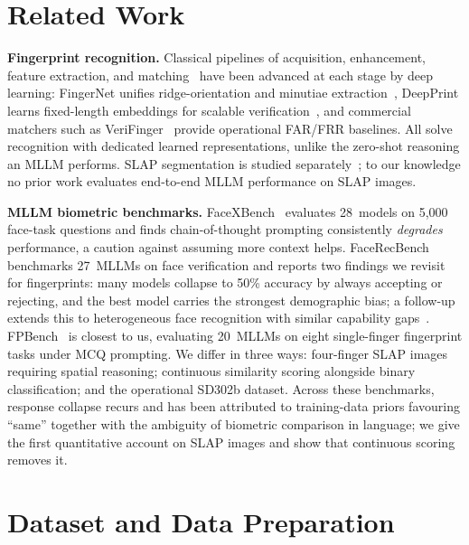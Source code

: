 \documentclass[runningheads]{llncs}
\begin{document}
\section{Related Work}
\label{sec:related}

\textbf{Fingerprint recognition.}
Classical pipelines of acquisition, enhancement, feature extraction, and
matching~\cite{maltoni_handbook} have been advanced at each stage by deep
learning: FingerNet unifies ridge-orientation and minutiae
extraction~\cite{fingerNet}, DeepPrint learns fixed-length embeddings for
scalable verification~\cite{deepprint}, and commercial matchers such as
VeriFinger~\cite{verifinger} provide operational FAR/FRR baselines. All solve
recognition with dedicated learned representations, unlike the zero-shot
reasoning an MLLM performs. SLAP segmentation is studied
separately~\cite{murshed2024SlapSeg}; to our knowledge no prior work
evaluates end-to-end MLLM performance on SLAP images.

\textbf{MLLM biometric benchmarks.}
FaceXBench~\cite{facexbench2024} evaluates 28~models on 5{,}000 face-task
questions and finds chain-of-thought prompting consistently \emph{degrades}
performance, a caution against assuming more context helps.
FaceRecBench~\cite{facerecbench2025} benchmarks 27~MLLMs on face verification
and reports two findings we revisit for fingerprints: many models collapse to
50\% accuracy by always accepting or rejecting, and the best model carries the
strongest demographic bias; a follow-up extends this to heterogeneous face
recognition with similar capability gaps~\cite{shahreza2026hfr}.
FPBench~\cite{fpbench2025} is closest to us, evaluating 20~MLLMs on eight
single-finger fingerprint tasks under MCQ prompting. We differ in three ways:
four-finger SLAP images requiring spatial reasoning; continuous similarity
scoring alongside binary classification; and the operational SD302b dataset.
Across these benchmarks, response collapse recurs and has been attributed to
training-data priors favouring ``same'' together with the ambiguity of
biometric comparison in language; we give the first quantitative account on
SLAP images and show that continuous scoring removes it.

\section{Dataset and Data Preparation}
\label{sec:dataset}
\end{document}
